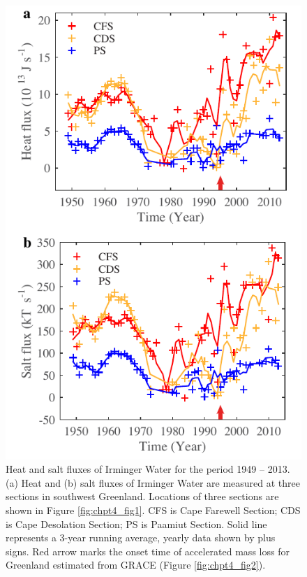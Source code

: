 \clearpage
\begin{figure}
	\centering
	\includegraphics{figs_chpt4/Fig3.pdf}	
	\caption[Heat and salt fluxes of Irminger Water for the period 1949 – 2013.]{Heat and salt fluxes of Irminger Water for the period 1949 – 2013. (a) Heat and (b) salt fluxes of Irminger Water are measured at three sections in southwest Greenland.  Locations of three sections are shown in Figure \ref{fig:chpt4_fig1}.  CFS is Cape Farewell Section; CDS is Cape Desolation Section; PS is Paamiut Section.  Solid line represents a 3-year running average, yearly data shown by plus signs.  Red arrow marks the onset time of accelerated mass loss for Greenland estimated from GRACE (Figure \ref{fig:chpt4_fig2}).}
	\label{fig:chpt4_fig3}
\end{figure}

